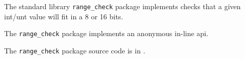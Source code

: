 
The standard library {\tt range\_check} package implements checks that a given int/unt value will fit in a 8 or 16 bits.

The {\tt range\_check} package implements an anonymous in-line api.

The {\tt range\_check} package source code is in .

